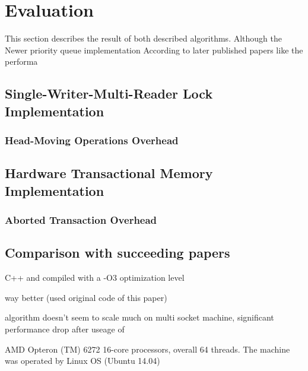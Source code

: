 
\section{Evaluation}

This section describes the result of both described algorithms. Although the   Newer priority queue implementation According to later published papers like \cite{braginsky_cbpq:_2016, } the performa



\subsection{Single-Writer-Multi-Reader Lock Implementation}

\subsubsection{Head-Moving Operations Overhead}

\subsection{Hardware Transactional Memory Implementation}

\subsubsection{Aborted Transaction Overhead}

\subsection{Comparison with succeeding papers}

C++ and compiled with a -O3 optimization level

\cite{braginsky_cbpq:_2016, } way better (used original code of this paper)

algorithm doesn't seem to scale much on multi socket machine, significant performance drop after useage of

AMD Opteron (TM) 6272
16-core processors, overall 64 threads. The machine was operated by Linux OS
(Ubuntu 14.04)